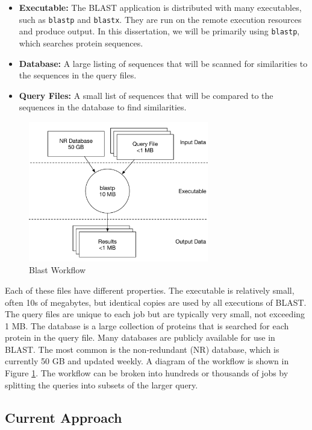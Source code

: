 \begin{itemize}
	\item \textbf{Executable:} The BLAST application is distributed with many executables, such as \texttt{blastp} and \texttt{blastx}.  They are run on the remote execution resources and produce output.  In this dissertation, we will be primarily using \texttt{blastp}, which searches protein sequences.
	\item \textbf{Database:}  A large listing of sequences that will be scanned for similarities to the sequences in the query files.
	\item \textbf{Query Files:} A small list of sequences that will be compared to the sequences in the database to find similarities.  
\end{itemize}

\begin{figure}
	\centering
	\includegraphics[width=0.7\textwidth]{images/BlastWorkflow}
	\caption{Blast Workflow}
	\label{fig:blastworkflow}
\end{figure}

Each of these files have different properties.  The executable is relatively small, often 10s of megabytes, but identical copies are used by all executions of BLAST.  The query files are unique to each job but are typically very small, not exceeding 1 MB.  The database is a large collection of proteins that is searched for each protein in the query file.  Many databases are publicly available for use in BLAST.  The most common is the non-redundant (NR) database, which is currently 50 GB and updated weekly.  A diagram of the workflow is shown in Figure \ref{fig:blastworkflow}.  The workflow can be broken into hundreds or thousands of jobs by splitting the queries into subsets of the larger query.

\subsection{Current Approach}


